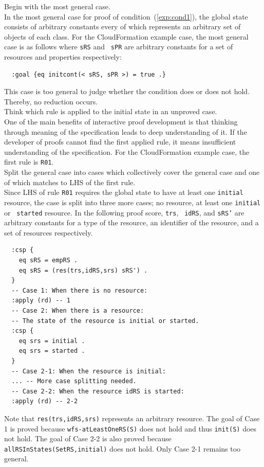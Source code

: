 \documentclass[12pt]{report}
\newcommand{\stt}[1]{{\small{\tt {#1}}}}
\begin{document}
 Begin with the most general case. \\ In the
most general case for proof of condition~(\ref{exp:cond1}), the global
state consists of arbitrary constants every of which represents an
arbitrary set of objects of each class. For the CloudFormation example
case, the most general case is as follows where {\tt sRS} and {\tt
  sPR} are arbitrary constants for a set of resources and properties
respectively:
\small
\begin{verbatim}
  :goal {eq initcont(< sRS, sPR >) = true .}
\end{verbatim}
\normalsize
This case is too general to judge whether the condition does or does
not hold. Thereby, no reduction occurs.\\

 Think which rule is applied to the initial
state in an unproved case. \\ One of the main benefits of interactive
proof development is that thinking through meaning of the
specification leads to deep understanding of it. If the developer of
proofs cannot find the first applied rule, it means insufficient
understanding of the specification. For the CloudFormation example
case, the first rule is {\tt R01}. \\

 Split the general case into cases which
collectively cover the general case and one of which matches to LHS of
the first rule. \\ Since LHS of rule {\tt R01} requires the global
state to have at least one {\tt initial} resource, the case is split
into three more cases; no resource, at least one {\tt initial} or {\tt
  started} resource. In the following proof score, {\tt trs}, {\tt
  idRS}, and {\tt sRS'} are arbitrary constants for a type of the
resource, an identifier of the resource, and a set of resources
respectively. 
\small
\begin{verbatim}
  :csp { 
    eq sRS = empRS .
    eq sRS = (res(trs,idRS,srs) sRS') .
  }
  -- Case 1: When there is no resource:
  :apply (rd) -- 1
  -- Case 2: When there is a resource:
  -- The state of the resource is initial or started.
  :csp { 
    eq srs = initial .
    eq srs = started .
  }
  -- Case 2-1: When the resource is initial:
  ... -- More case splitting needed.
  -- Case 2-2: When the resource idRS is started:
  :apply (rd) -- 2-2
\end{verbatim}
\normalsize
Note that \stt{res(trs,idRS,srs)} represents an arbitrary resource.
The goal of Case 1 is proved because \stt{wfs-atLeastOneRS(S)} does
not hold and thus \stt{init(S)} does not hold. The goal of Case 2-2 is
also proved because \stt{allRSInStates(SetRS,initial)} does not hold.
Only Case 2-1 remains too general.\\
\end{document}
